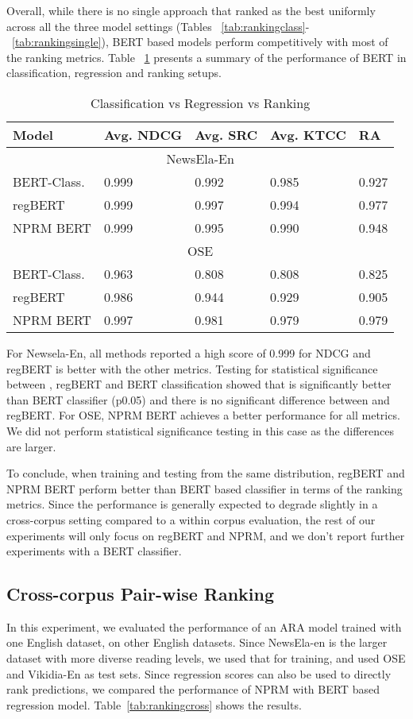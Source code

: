 \documentclass[11pt]{article}
\begin{document}
Overall, while there is no single approach that ranked as the best uniformly across all the three model settings (Tables ~\ref{tab:rankingclass}-~\ref{tab:rankingsingle}), BERT based models perform competitively with most of the ranking metrics. Table ~\ref{tab:allthreebert} presents a summary of the performance of BERT in classification, regression and ranking setups. 

\begin{table}[htb]
\begin{tabular}{ |p{2.5cm}|p{0.9cm}|p{0.7cm}|p{0.9cm}| p{0.8cm}|}
 \hline
Model & Avg. NDCG & Avg. SRC & Avg. KTCC & RA\\
 \hline
\multicolumn{5}{|c|}{NewsEla-En} \\
\hline 
BERT-Class. & 0.999 & 0.992 &  0.985 & 0.927\\
regBERT & 0.999 & 0.997 & 0.994 & 0.977\\
NPRM BERT & 0.999 & 0.995 & 0.990 & 0.948\\
 \hline 
 \multicolumn{5}{|c|}{OSE}\\
 \hline
BERT-Class. & 0.963   & 0.808   & 0.808 & 0.825\\
regBERT & 0.986 & 0.944 & 0.929 & 0.905\\
NPRM BERT & 0.997  & 0.981 & 0.979 & 0.979\\
 \hline
\end{tabular}
\caption{Classification vs Regression vs Ranking}
\label{tab:allthreebert}
\end{table}
For Newsela-En, all methods reported a high score of 0.999 for NDCG and regBERT is better with the other metrics. Testing for statistical significance between , regBERT and BERT classification showed that  is significantly better than BERT classifier (p0.05) and there is no significant difference between  and regBERT. For OSE, NPRM BERT achieves a better performance for all metrics. We did not perform statistical significance testing in this case as the differences are larger.  

To conclude, when training and testing from the same distribution, regBERT and NPRM BERT perform better than BERT based classifier in terms of the ranking metrics. Since the performance is generally expected to degrade slightly in a cross-corpus setting compared to a within corpus evaluation, the rest of our experiments will only focus on regBERT and NPRM, and we don't report further experiments with a BERT classifier. 

\subsection{Cross-corpus Pair-wise Ranking}
In this experiment, we evaluated the performance of an ARA model trained with one English dataset, on other English datasets. Since NewsEla-en is the larger dataset with more diverse reading levels, we used that for training, and used OSE and Vikidia-En as test sets. Since regression scores can also be used to directly rank predictions, we compared the performance of NPRM with BERT based regression model. Table~\ref{tab:rankingcross} shows the results. 
\end{document}
